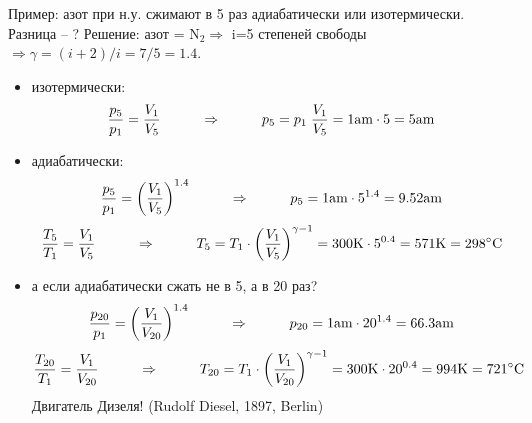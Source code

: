 \documentclass[12pt,epsfig,color,russian]{article}
\begin{document}
Пример: азот при н.у. сжимают в 5 раз адиабатически или изотермически. Разница -- ?
Решение: азот = N$_2 \Rightarrow$ i=5 степеней свободы $\Rightarrow \gamma =(i+2)/i =7/5=1.4$. \begin{itemize}
\item изотермически:
       \begin{displaymath}
       \frac{p_5}{p_1}=\frac{V_1}{V_5}\hspace{10mm}\Rightarrow\hspace{10mm}
       p_5=p_1\;\frac{V_1}{V_5}=1{\rm am}\cdot 5 = 5{\rm am}
       \end{displaymath}
\item адиабатически:
       \begin{displaymath}
       \frac{p_5}{p_1}=\left(\frac{V_1}{V_5}\right)^{1.4}\hspace{10mm}\Rightarrow\hspace{10mm}
       p_5=1{\rm am}\cdot 5^{1.4} = 9.52{\rm am}
       \end{displaymath}
       \begin{displaymath}
       \frac{T_5}{T_1}=\frac{V_1}{V_5}\hspace{10mm}\Rightarrow\hspace{10mm}
       T_5=T_1\cdot\left(\frac{V_1}{V_5}\right)^{\gamma-1}=
       300{\rm K}\cdot 5^{0.4} = 571{\rm K}=298^\circ{\rm C}
       \end{displaymath}
\item а если адиабатически сжать не в 5, а в 20 раз?
       \begin{displaymath}
       \frac{p_{20}}{p_1}=\left(\frac{V_1}{V_{20}}\right)^{1.4}\hspace{10mm}\Rightarrow\hspace{10mm}
       p_{20}=1{\rm am}\cdot 20^{1.4} = 66.3{\rm am}
       \end{displaymath}
       \begin{displaymath}
       \frac{T_{20}}{T_1}=\frac{V_1}{V_{20}}\hspace{10mm}\Rightarrow\hspace{10mm}
       T_{20}=T_1\cdot\left(\frac{V_1}{V_{20}}\right)^{\gamma-1}=
       300{\rm K}\cdot 20^{0.4} = 994{\rm K}=721^\circ{\rm C}
       \end{displaymath}
       Двигатель Дизеля! (Rudolf Diesel, 1897, Berlin)
\end{itemize}
\end{document}
